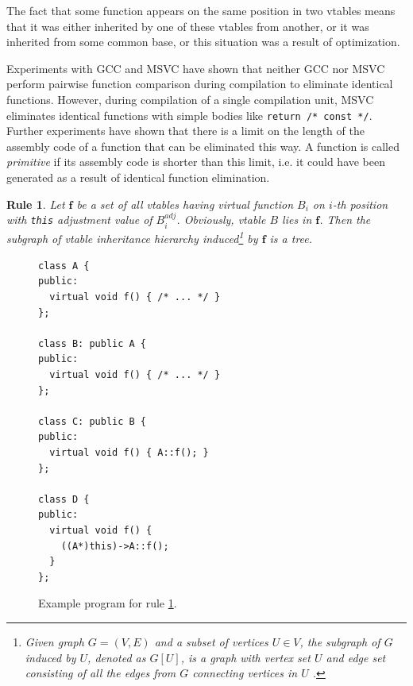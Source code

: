 \documentclass[10pt, conference]{IEEEtran}
\newcommand{\ib}[1]{\textbf{#1}}
\newcommand{\gf}{\ib{f}}
\newcommand{\adj}{\textit{adj}}
\newtheorem{rulez}{Rule}
\begin{document}
The fact that some function appears on the same position in
two vtables means that it was either inherited by one of
these vtables from another, or it was inherited from some common base,
or this situation was a result of optimization.

Experiments with GCC and MSVC have shown that
neither GCC nor MSVC perform pairwise function comparison during compilation
to eliminate identical functions.
However, during compilation of a single compilation unit,
MSVC eliminates identical functions with simple bodies
like \lstinline{return /* const */}.
Further experiments have shown that there is a limit on the length
of the assembly code of a function that can be eliminated this way.
A function is called \textit{primitive} if its assembly code
is shorter than this limit, i.e. it could have been generated as a result
of identical function elimination.

\begin{rulez}\label{stmt:fsets_2}
Let {\em $\gf$} be a set of all vtables having virtual function $B_i$ on $i$-th position 
with \lstinline{this} adjustment value of $B_i^{\adj}$.
Obviously, vtable $B$ lies in {\em $\gf$}.
Then the subgraph of vtable inheritance hierarchy induced\footnote{Given graph $G = (V, E)$ and a subset of vertices $U \in V$, the subgraph of $G$ induced by $U$, denoted as $G[U]$, is a graph with vertex set $U$ and edge set consisting of all the edges from $G$ connecting vertices in $U$ \cite{rosen02}.} by {\em $\gf$} is a tree.
\end{rulez}

\begin{figure}[tb!]
\hspace{0.5cm}
\begin{minipage}[b]{1cm}
{
\lstset{basicstyle=\footnotesize}
\begin{lstlisting}
class A {
public:
  virtual void f() { /* ... */ }
};
 
class B: public A {
public:
  virtual void f() { /* ... */ }
};
 
class C: public B {
public:
  virtual void f() { A::f(); }
};
 
class D {
public:
  virtual void f() { 
    ((A*)this)->A::f();
  }
};
\end{lstlisting}
}
\end{minipage}
\caption{Example program for rule \ref{stmt:fsets_2}.}
\label{listing:inheritance_example}
\end{figure}
\end{document}
